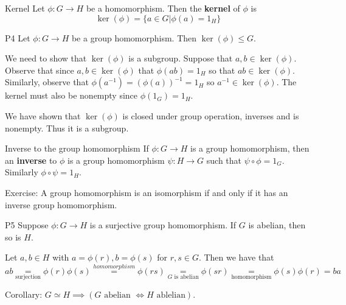 \documentclass{article}
\begin{document}
\begin{cdef}{Kernel}{}
    Let $\phi: G \to H$ be a homomorphism. Then the \textbf{kernel} of $\phi$ is 
    \[
    \ker(\phi) = \{ a \in G | \phi(a) = 1_H \}
    \]
\end{cdef}

\begin{cprop}{P4}{}
    Let $ \phi : G \to H$ be a group homomorphism. Then $\ker(\phi) \leq G$. 

    \begin{cpf}
        We need to show that $\ker(\phi)$ is a subgroup. Suppose that $a,b \in \ker(\phi)$. Observe that since $a,b \in \ker(\phi)$ that $\phi(ab) = 1_H$ so that $ab \in \ker(\phi)$. Similarly, observe that $\phi(a^{-1}) = \left( \phi(a) \right)^{-1} = 1_H$ so $a^{-1} \in \ker(\phi)$. The kernel must also be nonempty since $\phi(1_G) = 1_H$. 

        We have shown that $\ker(\phi)$ is closed under group operation, inverses and is nonempty. Thus it is a subgroup.
    \end{cpf}
\end{cprop}


\begin{cdef}{Inverse to the group homomorphism}{}
    If $\phi: G \to H$ is a group homomorphism, then an \textbf{inverse} to $\phi$ is a group homomorphism $\psi : H \to G$ such that $\psi \circ \phi = 1_G$. Similarly $\phi \circ \psi = 1_H$. 
\end{cdef}

Exercise: A group homomorphism is an isomorphism if and only if it has an inverse group homomorphism.

\begin{cprop}{P5}{}
    Suppose $ \phi : G \to H$ is a surjective group homomorphism. If $G$ is abelian, then so is $H$. 

    \begin{cpf}
       Let $a,b \in H$ with $a = \phi(r), b = \phi(s)$ for $r,s \in G$.  Then we have that
       \[
           ab \underset{\text{surjection}}{=} \phi(r)\phi(s) \overset{homomorphism}{=} \phi(rs) \underset{G \text{ is abelian}}{=} \phi(sr) \underset{\text{homomorphism}}{=} \phi(s)\phi(r) = ba
       \]
    \end{cpf}
\end{cprop}

Corollary: $G \simeq H \implies \left(G \text{ abelian } \iff H \text{ ablelian} \right)$. 
\end{document}
